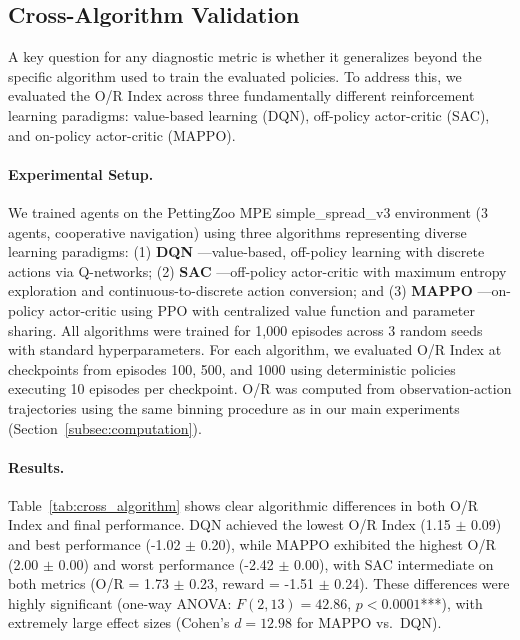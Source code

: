 
\subsection{Cross-Algorithm Validation}
\label{sec:cross_algorithm}

A key question for any diagnostic metric is whether it generalizes beyond the specific algorithm used to train the evaluated policies. To address this, we evaluated the O/R Index across three fundamentally different reinforcement learning paradigms: value-based learning (DQN), off-policy actor-critic (SAC), and on-policy actor-critic (MAPPO).

\paragraph{Experimental Setup.}
We trained agents on the PettingZoo MPE simple\_spread\_v3 environment (3 agents, cooperative navigation) using three algorithms representing diverse learning paradigms: (1) \textbf{DQN} \citep{mnih2015human}—value-based, off-policy learning with discrete actions via Q-networks; (2) \textbf{SAC} \citep{haarnoja2018soft}—off-policy actor-critic with maximum entropy exploration and continuous-to-discrete action conversion; and (3) \textbf{MAPPO} \citep{yu2022surprising}—on-policy actor-critic using PPO with centralized value function and parameter sharing. All algorithms were trained for 1,000 episodes across 3 random seeds with standard hyperparameters. For each algorithm, we evaluated O/R Index at checkpoints from episodes 100, 500, and 1000 using deterministic policies executing 10 episodes per checkpoint. O/R was computed from observation-action trajectories using the same binning procedure as in our main experiments (Section~\ref{subsec:computation}).

\paragraph{Results.}
Table~\ref{tab:cross_algorithm} shows clear algorithmic differences in both O/R Index and final performance. DQN achieved the lowest O/R Index (1.15 $\pm$ 0.09) and best performance (-1.02 $\pm$ 0.20), while MAPPO exhibited the highest O/R (2.00 $\pm$ 0.00) and worst performance (-2.42 $\pm$ 0.00), with SAC intermediate on both metrics (O/R = 1.73 $\pm$ 0.23, reward = -1.51 $\pm$ 0.24). These differences were highly significant (one-way ANOVA: $F(2, 13) = 42.86$, $p < 0.0001$***), with extremely large effect sizes (Cohen's $d = 12.98$ for MAPPO vs.\ DQN).


